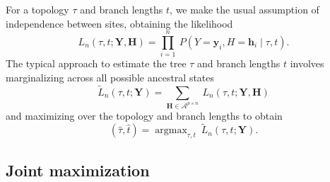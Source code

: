 \documentclass{article}
\newcommand{\alphabet}{\mathcal{A}}
\newcommand{\fullAlignment}{\mathbf{Y}}
\newcommand{\alignmentColumn}{\mathbf{y}}
\newcommand{\alignmentColumnRV}{Y}
\newcommand{\fullAncestralStates}{\mathbf{H}}
\newcommand{\ancestralStateColumn}{\mathbf{h}}
\newcommand{\ancestralStateColumnRV}{H}
\newcommand{\nCols}{n}
\newcommand{\nAncestralStateRows}{p}
\DeclareMathOperator*{\argmax}{argmax}
\begin{document}
For a topology $\tau$ and branch lengths $t$, we make the usual assumption of independence between sites, obtaining the likelihood
\begin{equation}
\label{eq:full_likelihood}
L_\nCols(\tau, t; \fullAlignment,\fullAncestralStates) = \prod_{i=1}^{\nCols} \ P(\alignmentColumnRV=\alignmentColumn_i, \ancestralStateColumnRV=\ancestralStateColumn_i \mid \tau, t).
\end{equation}
The typical approach to estimate the tree $\tau$ and branch lengths $t$ involves marginalizing across all possible ancestral states
\begin{equation}
\label{eq:marginal_likelihood}
\tilde{L}_\nCols(\tau, t; \fullAlignment) = \sum_{\fullAncestralStates\in\alphabet^{\nAncestralStateRows\times\nCols}} \ L_\nCols(\tau, t; \fullAlignment, \fullAncestralStates)
\end{equation}
and maximizing over the topology and branch lengths to obtain
$$
(\hat{\tau}, \hat{t}) = \argmax_{\tau, t} \  \tilde{L}_\nCols(\tau, t; \fullAlignment).
$$

\subsection{Joint maximization}
\end{document}

